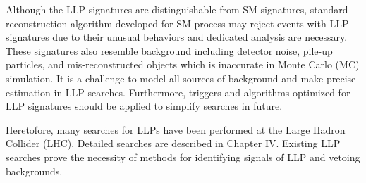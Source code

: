 Although the LLP signatures are distinguishable from SM signatures, standard reconstruction algorithm developed for SM process may reject events with LLP signatures due to their unusual behaviors and dedicated analysis are necessary. These signatures also resemble background including detector noise, pile-up particles, and mis-reconstructed objects which is inaccurate in  Monte Carlo (MC) simulation. It is a challenge to model all sources of background and  make precise estimation in LLP searches. Furthermore, triggers and algorithms optimized for LLP signatures should be applied to simplify searches in future.

Heretofore, many searches for LLPs have been performed at the Large Hadron Collider (LHC). Detailed searches are described in Chapter IV. Existing LLP searches prove the necessity of methods for identifying signals of LLP and vetoing backgrounds. 
